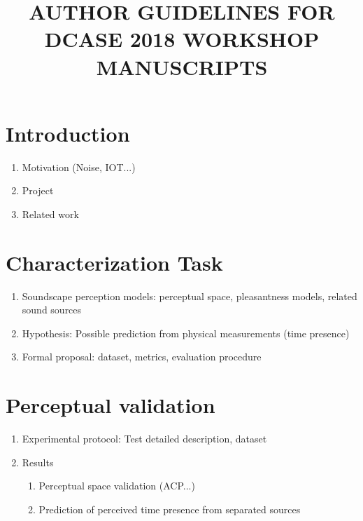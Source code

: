 \documentclass{article}
\title{AUTHOR GUIDELINES FOR DCASE 2018 WORKSHOP MANUSCRIPTS}
\begin{document}
\ninept
\maketitle

\begin{sloppy}

\begin{abstract}
\end{abstract}

\begin{keywords}
\end{keywords}


\section{Introduction}
\label{sec:intro}

\begin{enumerate}
\item Motivation (Noise, IOT...)
\item Project
\item Related work
\end{enumerate}

\section{Characterization Task}
\label{sec:format}

\begin{enumerate}
\item Soundscape perception models: perceptual space, pleasantness models, related sound sources
\item Hypothesis: Possible prediction from physical measurements (time presence)
\item Formal proposal: dataset, metrics, evaluation procedure
\end{enumerate}


\section{Perceptual validation}
\label{sec:pagelimit}

\begin{enumerate}
\item Experimental protocol: Test detailed description, dataset
\item Results
\begin{enumerate}
\item Perceptual space validation (ACP...)
\item Prediction of perceived time presence from separated sources
\end{enumerate}
\end{enumerate}


\end{sloppy}
\end{document}
